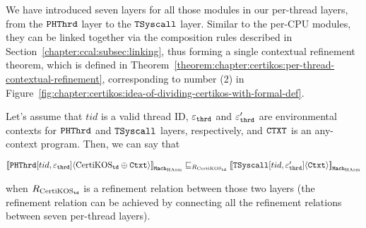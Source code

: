 We have introduced seven layers for all those modules in our per-thread layers, from the ${{\mathrm{\texttt{PHThrd}}}}$ layer to the 
${{\mathrm{\texttt{TSyscall}}}}$ layer.
Similar to the per-CPU modules, they  can be linked together via the composition rules described in Section~\ref{chapter:ccal:subsec:linking},
thus forming a single contextual refinement theorem, which is defined in Theorem~\ref{theorem:chapter:certikos:per-thread-contextual-refinement},
corresponding to  number (2) in Figure~\ref{fig:chapter:certikos:idea-of-dividing-certikos-with-formal-def}.
\begin{theorem}
\label{theorem:chapter:certikos:per-thread-contextual-refinement}
Let's assume that $tid$ is a valid thread ID, ${\varepsilon}_{{\mathrm{\texttt{thrd}}}}$ and  ${\varepsilon}'_{{\mathrm{\texttt{thrd}}}}$ are environmental contexts for 
${{\mathrm{\texttt{PHThrd}}}}$  and ${{\mathrm{\texttt{TSyscall}}}}$ layers, respectively, and ${\mathrm{\texttt{CTXT}}}$ is an any-context program. Then, we can say that
\begin{center}
${[\![{{{\mathrm{\texttt{PHThrd}}}}[tid, {\varepsilon}_{{\mathrm{\texttt{thrd}}}}]} \langle {\mathrm{CertiKOS}_{{\mathrm{\texttt{td}}}} \oplus {\mathrm{\texttt{Ctxt}}}} \rangle]\!]}_{{\mathrm{\texttt{Mach}}}_{\mathrm{HAsm}}} \sqsubseteq_{R_{\mathrm{CertiKOS}_{\mathrm{\texttt{td}}}}} {[\![{{{\mathrm{\texttt{TSyscall}}}}[tid, {\varepsilon}'_{{\mathrm{\texttt{thrd}}}}]} \langle {{\mathrm{\texttt{Ctxt}}}} \rangle]\!]}_{{\mathrm{\texttt{Mach}}}_{\mathrm{HAsm}}}$
\end{center}
when ${R_{\mathrm{CertiKOS}_{\mathrm{\texttt{td}}}}}$ is a refinement relation between those two layers (the refinement relation can be achieved by 
connecting all the refinement relations  between seven per-thread layers).
\end{theorem}


%
